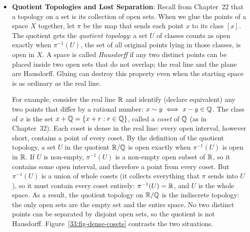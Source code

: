 \begin{itemize}
  \item \textbf{Quotient Topologies and Lost Separation}: Recall from Chapter~22 that a topology on a set is its collection of open sets. When we glue the points of a space $X$ together, let $\pi$ be the map that sends each point $x$ to its class $[x]$. The quotient gets the \emph{quotient topology}: a set $U$ of classes counts as open exactly when $\pi^{-1}(U)$, the set of all original points lying in those classes, is open in $X$. A space is called \emph{Hausdorff} if any two distinct points can be placed inside two open sets that do not overlap; the real line and the plane are Hausdorff. Gluing can destroy this property even when the starting space is as ordinary as the real line.
  
  For example, consider the real line $\mathbb{R}$ and identify (declare equivalent) any two points that differ by a rational number: $x \sim y \iff x - y \in \mathbb{Q}$. The class of $x$ is the set $x + \mathbb{Q} = \{x + r : r \in \mathbb{Q}\}$, called a \emph{coset} of $\mathbb{Q}$ (as in Chapter~32). Each coset is dense in the real line: every open interval, however short, contains a point of every coset. By the definition of the quotient topology, a set $U$ in the quotient $\mathbb{R}/\mathbb{Q}$ is open exactly when $\pi^{-1}(U)$ is open in $\mathbb{R}$. If $U$ is non-empty, $\pi^{-1}(U)$ is a non-empty open subset of $\mathbb{R}$, so it contains some open interval, and therefore a point from every coset. But $\pi^{-1}(U)$ is a union of whole cosets (it collects everything that $\pi$ sends into $U$), so it must contain every coset entirely: $\pi^{-1}(U) = \mathbb{R}$, and $U$ is the whole space. As a result, the quotient topology on $\mathbb{R}/\mathbb{Q}$ is the indiscrete topology: the only open sets are the empty set and the entire space. No two distinct points can be separated by disjoint open sets, so the quotient is not Hausdorff. Figure~\ref{33:fig-dense-cosets} contrasts the two situations.

\begin{figure}[htbp]
\centering
{}
\end{figure}
\end{itemize}
